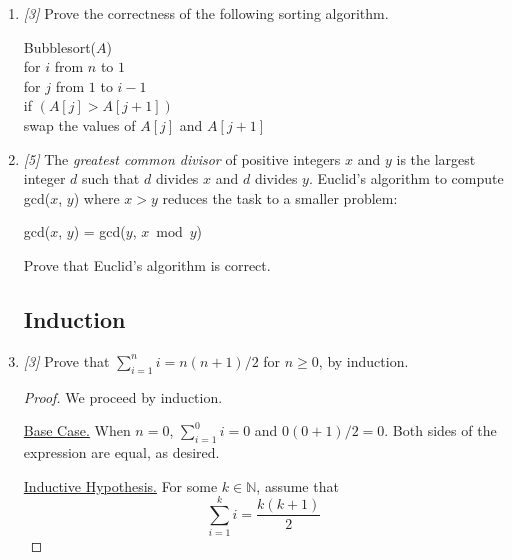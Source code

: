 \documentclass[10pt, letterpaper]{article}
\numberwithin{equation}{section}
\begin{document}
\begin{enumerate}
        \item \textit{[3]} Prove the correctness of the following sorting algorithm.
        \begin{flushleft}
            \hspace{2em} Bubblesort($A$) \\
            \hspace{4em} for $i$ from $n$ to $1$ \\
            \hspace{6em} for $j$ from $1$ to $i - 1$ \\
            \hspace{8em} if $(A[j] > A[j + 1])$ \\
            \hspace{10em} swap the values of $A[j]$ and $A[j + 1]$
        \end{flushleft}

        \item \textit{[5]} The \textit{greatest common divisor} of positive integers $x$ and $y$ is
        the largest integer $d$ such that $d$ divides $x$ and $d$ divides $y$. Euclid's algorithm to
        compute gcd($x$, $y$) where $x > y$ reduces the task to a smaller problem:
        \begin{center}
            gcd($x$, $y$) = gcd($y$, $x \bmod y$)
        \end{center}
        Prove that Euclid's algorithm is correct.

        \subsection*{Induction}

        \item \textit{[3]} Prove that $\sum_{i = 1}^{n} i = n(n + 1) / 2$ for $n \geq 0$, by
        induction.

        \begin{proof}
            We proceed by induction.

            \underline{Base Case.} When $n = 0$, $\sum_{i = 1}^{0} i = 0$ and $0(0 + 1) / 2 = 0$.
            Both sides of the expression are equal, as desired.

            \underline{Inductive Hypothesis.} For some $k \in \mathbb{N}$, assume that
            \begin{equation*}
                \sum_{i = 1}^{k} i = \frac{k(k + 1)}{2}
            \end{equation*}


\end{proof}
\end{enumerate}
\end{document}
